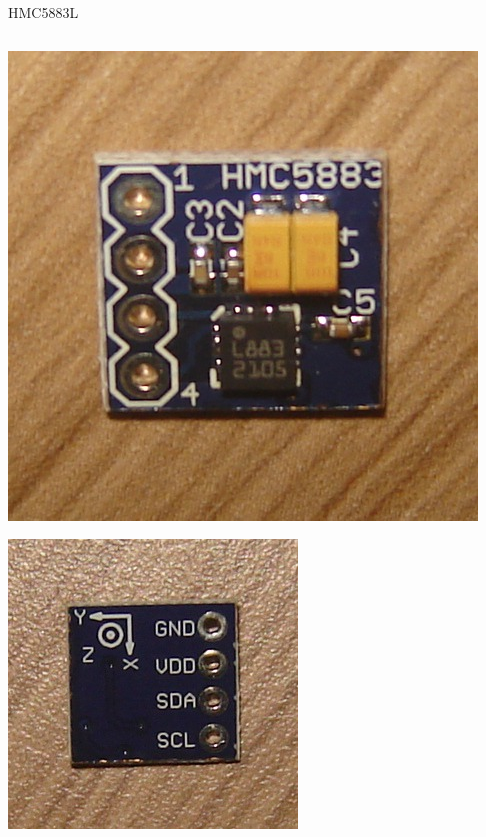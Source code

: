 \documentclass{beamer}
\begin{document}
\begin{frame}[label=fotos-sensor]{HMC5883L}
	\begin{columns}
		\begin{center}
			\includegraphics[height=0.4\textheight]{../monografia/img/sensor_front.jpg}

			\includegraphics[height=0.4\textheight]{../monografia/img/sensor_back.jpg}
		\end{center}


\end{columns}
\end{frame}
\end{document}
